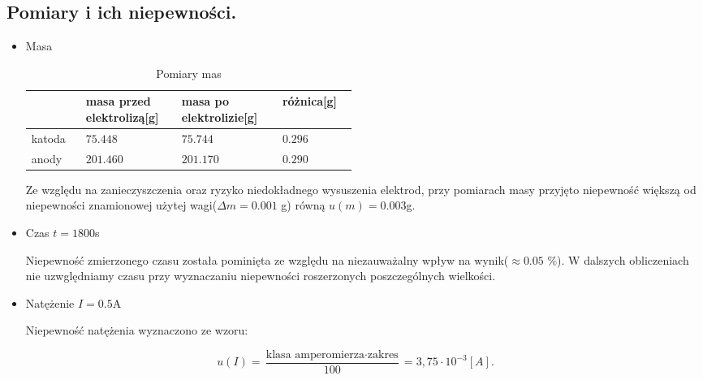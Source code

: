 \documentclass [a4paper,11pt]{article}
\begin{document}
	\subsection{Pomiary i ich niepewności.}
	\begin{itemize}
		\item Masa
			
			\begin{table}
				\label{tab:masaPom}
				\caption{Pomiary mas}
				\begin{center}
				\begin{tabular}{p{0.1\linewidth}|p{0.13\linewidth}|p{0.15\linewidth}|p{0.1\linewidth}}
					&masa przed elektrolizą[g]&masa po elektrolizie[g]& różnica[g]\\
					\hline
					katoda&$75.448$&$75.744$&$0.296$ \\
					\hline
					anody &$201.460$&$201.170$&$0.290$ \\
				\end{tabular} 
					\end{center}	
			\end{table}
			

		Ze względu na zanieczyszczenia oraz ryzyko niedokładnego wysuszenia elektrod, przy pomiarach masy przyjęto niepewność większą od niepewności znamionowej użytej wagi($\Delta m=0.001$ g) równą $u(m)=0.003$g. 
		
		\item Czas $ t=1800$s
		
		Niepewność zmierzonego czasu została pominięta ze względu na niezauważalny wpływ na wynik($\approx0.05$ \%). W dalszych obliczeniach nie uzwględniamy czasu 
		przy wyznaczaniu niepewności roszerzonych poszczególnych wielkości.
		
		\item Natężenie $I=0.5$A
		
		Niepewność natężenia wyznaczono ze wzoru:
	\end{itemize}
	\begin{equation}
	\label{eq:amper}
	u(I) = \frac{\text{klasa amperomierza} \cdot \text{zakres}}{100} = 3,75 \cdot 10^{-3} [A].
	\end{equation}
\end{document}
